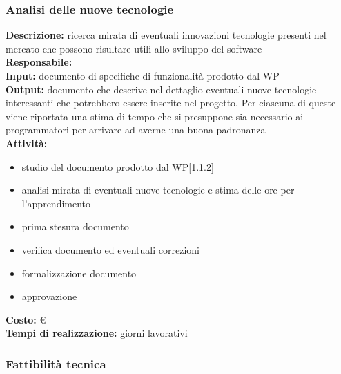\subsubsection{Analisi delle nuove tecnologie}
\textbf{Descrizione:} ricerca mirata di eventuali innovazioni tecnologie presenti nel mercato che possono risultare utili allo sviluppo del software\\
\linebreak
\textbf{Responsabile:} \\
\linebreak
\textbf{Input:} documento di specifiche di funzionalità prodotto dal WP\\
\linebreak
\textbf{Output:} documento che descrive nel dettaglio eventuali nuove tecnologie interessanti che potrebbero essere inserite nel progetto. Per ciascuna di queste viene riportata una stima di tempo che si presuppone sia necessario ai programmatori per arrivare ad averne una buona padronanza\\
\linebreak
\textbf{Attività:}
\begin{itemize}
\item studio del documento prodotto dal WP[1.1.2]
\item analisi mirata di eventuali nuove tecnologie e stima delle ore per l'apprendimento
\item prima stesura documento
\item verifica documento ed eventuali correzioni
\item formalizzazione documento
\item approvazione
\end{itemize}
\textbf{Costo:} \euro \\
\textbf{Tempi di realizzazione:}  giorni lavorativi



\subsubsection{Fattibilità tecnica}

